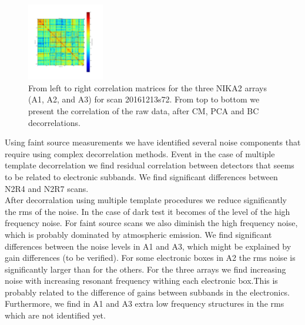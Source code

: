 \begin{figure}[ht]
\begin{center}
\includegraphics[width=0.3\textwidth]{Figures/DarkTests/corrmat_TOI_BC_array_3_20161213s72.pdf}
\end{center}
\caption{From left to right correlation matrices for the three NIKA2 arrays (A1, A2, and A3) for scan 20161213s72. From top to bottom we present the correlation of the raw data, after CM, PCA and BC decorrelations. \label{corrs72}}
\end{figure}

Using faint source measurements we have identified several noise components that require using complex decorrelation methods. Event in the case of multiple template decorrelation we find residual correlation between detectors that seems to be related to electronic subbands. We find significant differences between N2R4 and N2R7 scans. \\

After decorralation using multiple template procedures we reduce significantly the rms of the noise. In the case of dark test it becomes of the level of the high frequency noise. For faint source scans we also diminish the high frequency noise, which is probably dominated by atmospheric emission. We find significant differences between the noise levels in A1 and A3, which might be explained by gain differences (to be verified). For some electronic boxes in A2 the rms noise is significantly larger than for the others. For the three arrays we find increasing noise with increasing resonant frequency withing each electronic box.This is probably related to the difference of gains between subbands in the electronics. Furthermore, we find in A1 and A3 extra low frequency structures in the rms which are not identified yet.


